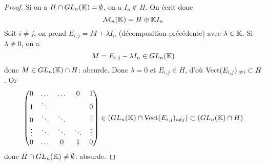 \documentclass[12pt]{article}
\begin{document}
\begin{proof}
    Si on a $H\cap GL_{n}(\mathbb{K})=\emptyset$, on a $I_{n}\notin H$. On écrit donc 
    \begin{equation}
        \mathcal{M}_{n}(\mathbb{K})=H\oplus \mathbb{K} I_{n}
    \end{equation}
    Soit $i\neq j$, on prend $E_{i,j}=M+\lambda I_{n}$ (décomposition précédente) avec $\lambda\in\mathbb{K}$. Si $\lambda\neq0$, on a
    \begin{equation}
        M=E_{i,j}-\lambda I_{n}\in GL_{n}(\mathbb{K})
    \end{equation}
    donc $M\in GL_{n}(\mathbb{K})\cap H$: absurde. Donc $\lambda=0$ et $E_{i,j}\in H$, d'où $\operatorname{Vect}(E_{i,j})_{,\neq i}\subset H$. Or
    \begin{equation}
        \begin{pmatrix}
            0 & \dots & \dots & 0 & 1\\
            1 & \ddots & & & 0\\
            0 & \ddots & \ddots& & \vdots\\
            \vdots & \ddots & \ddots&\ddots & \vdots\\
            0 & \dots& 0 & 1 & 0
        \end{pmatrix}\in \left(GL_{n}(\mathbb{K})\cap\operatorname{Vect}(E_{i,j})_{i\neq j}\right)\subset \left(GL_{n}(\mathbb{K})\cap H\right)
    \end{equation}
    donc $H\cap GL_{n}(\mathbb{K})\neq\emptyset$: absurde.
\end{proof}
\end{document}
